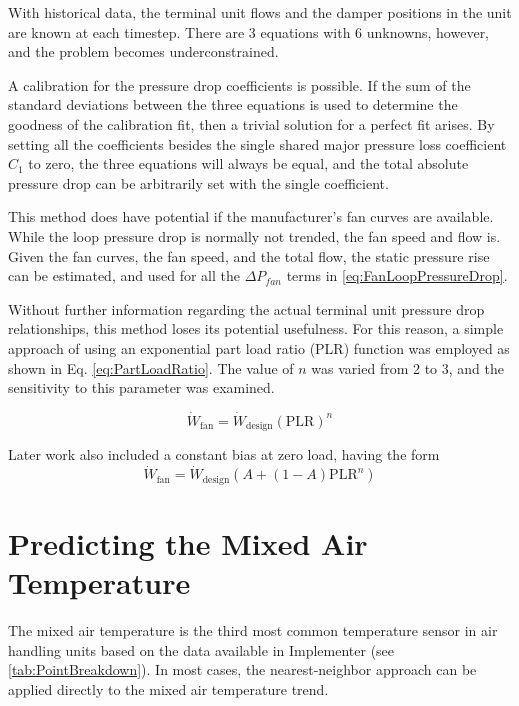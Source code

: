 With historical data, the terminal unit flows and the
damper positions in the unit are known at each timestep. There are 3 equations with 6
unknowns, however, and the problem becomes underconstrained.

A calibration for the pressure drop coefficients is possible. If the sum
of the standard deviations between the three equations is used to
determine the goodness of the calibration fit, then a trivial solution
for a perfect fit arises. By setting all the coefficients besides the
single shared major pressure loss coefficient \(C_1\) to zero, the three
equations will always be equal, and the total absolute pressure drop can
be arbitrarily set with the single coefficient.

This method does have potential if the manufacturer's fan curves are
available. While the loop pressure drop is normally not trended, the fan
speed and flow is. Given the fan curves, the fan speed, and the total
flow, the static pressure rise can be estimated, and used for all the
\(\Delta P_{fan} \) terms in  \ref{eq:FanLoopPressureDrop}.

Without further information regarding the actual terminal unit pressure
drop relationships, this method loses its potential usefulness. For this
reason, a simple approach of using an exponential part load ratio (PLR)
function was employed as shown in Eq. \ref{eq:PartLoadRatio}. The value
of \(n\) was varied from 2 to 3, and the sensitivity to this parameter was
examined.


\begin{equation}\label{eq:PartLoadRatio}
    \dot{W}_{\text{fan}} = \dot{W}_{\text{design}} \left(\text{PLR}\right)^n
\end{equation}

Later work also included a constant bias at zero load, having the form
\begin{equation}
    \dot{W}_{\text{fan}} = \dot{W}_{\text{design}} \left(A +
    \left(1-A\right)\text{PLR}^{n}\right)
\end{equation}

\section{Predicting the Mixed Air Temperature}

The mixed air temperature is the third most common temperature sensor in
air handling units based on the data available in Implementer
(see \tableref{} \ref{tab:PointBreakdown}). In most cases, the nearest-neighbor
approach can be applied directly to the mixed air temperature trend.


